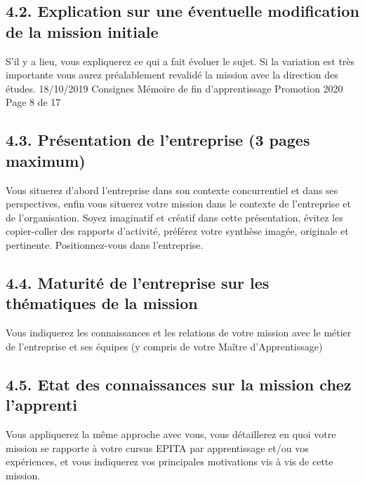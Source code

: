 \documentclass[a4paper, 12pt]{article}
\begin{document}
\subsection{4.2. Explication sur une éventuelle modification de la mission initiale}

    
    \newpage{}

S’il y a lieu, vous expliquerez ce qui a fait évoluer le sujet. Si la variation est très importante
vous aurez préalablement revalidé la mission avec la direction des études.
18/10/2019 Consignes Mémoire de fin d'apprentissage Promotion 2020 Page 8 de 17

\subsection{4.3. Présentation de l'entreprise (3 pages maximum)}

    
    \newpage{}

Vous situerez d’abord l’entreprise dans son contexte concurrentiel et dans ses perspectives, enfin vous
situerez votre mission dans le contexte de l’entreprise et de l’organisation. Soyez imaginatif et créatif
dans cette présentation, évitez les copier-coller des rapports d’activité, préférez votre synthèse imagée,
originale et pertinente. Positionnez-vous dans l’entreprise.

\subsection{4.4. Maturité de l’entreprise sur les thématiques de la mission}

    
    \newpage{}

Vous indiquerez les connaissances et les relations de votre mission avec le métier de l’entreprise et ses
équipes (y compris de votre Maître d’Apprentissage)

\subsection{4.5. Etat des connaissances sur la mission chez l’apprenti}

    
    \newpage{}

Vous appliquerez la même approche avec vous, vous détaillerez en quoi votre mission se rapporte à
votre cursus EPITA par apprentissage et/ou vos expériences, et vous indiquerez vos principales
motivations vis à vis de cette mission.
\end{document}
